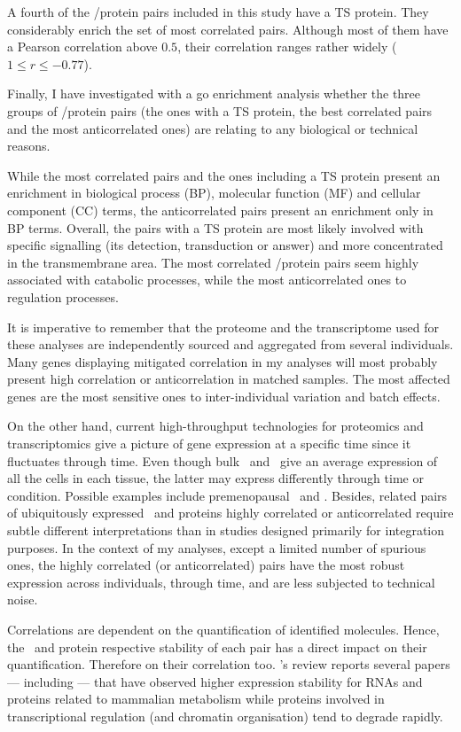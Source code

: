 A fourth of the \mRNA/protein pairs included in this study have a \gls{TS} protein.
They considerably enrich the set of most correlated pairs.
Although most of them have a Pearson correlation above $0.5$,
their correlation ranges rather widely ($1 ≤ r≤ -0.77$).

Finally, I have investigated with a \gls{go} enrichment analysis
whether the three groups of \mRNA/protein pairs
(the ones with a \gls{TS} protein, the best correlated pairs
and the most anticorrelated ones) are relating to
any biological or technical reasons.

While the most correlated pairs and the ones including a \gls{TS} protein
present an enrichment in biological process (BP),
molecular function (MF) and cellular component (CC) terms,
the anticorrelated pairs present an enrichment only in BP terms.
Overall, the pairs with a \gls{TS} protein are most likely involved
with specific signalling (its detection, transduction or answer)
and more concentrated in the transmembrane area.
The most correlated \mRNA/protein pairs seem highly associated
with catabolic processes,
while the most anticorrelated ones to regulation processes.

It is imperative to remember that the proteome and the transcriptome used
for these analyses are independently sourced and aggregated from several individuals.
Many genes displaying mitigated correlation in my analyses will most probably
present high correlation or anticorrelation in matched samples.
The most affected genes are the most sensitive ones
to inter-individual variation and batch effects.

On the other hand,
current high-throughput technologies
for proteomics and transcriptomics give a picture of gene expression
at a specific time
since it fluctuates through time.
Even though bulk \Rnaseq\ and \ms\ give an average expression
of all the cells in each tissue,
the latter may express differently through time or condition.
Possible examples include premenopausal \Ovary\ and \Uterus.
Besides, related pairs of ubiquitously expressed \mRNAs\ and proteins
highly correlated or anticorrelated require subtle different interpretations
than in studies designed primarily for integration purposes.
In the context of my analyses,
except a limited number of spurious ones,
the highly correlated (or anticorrelated) pairs have
the most robust expression across individuals, through time,
and are less subjected to technical noise.

Correlations are dependent on the quantification of identified molecules.
Hence, the \mRNA\ and protein respective stability of each pair has
a direct impact on their quantification.
Therefore on their correlation too.
\citet{Vogel2012-sq}'s review reports several papers
--- including \citet{schwanhausserglobal:2011} ---
that have observed higher expression stability for
\glspl{RNA} and proteins related to mammalian metabolism
while proteins involved in transcriptional regulation (and chromatin organisation)
tend to degrade rapidly.\mybr\

